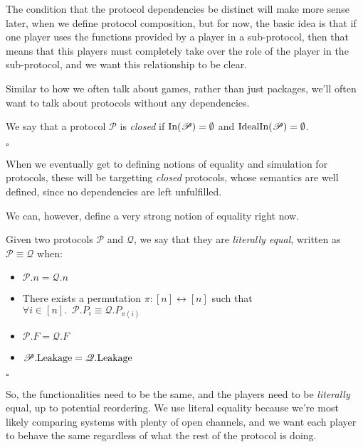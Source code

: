 The condition that the protocol dependencies be distinct
will make more sense later, when we define protocol composition,
but for now, the basic idea is that if one player uses
the functions provided by a player in a sub-protocol,
then that means that this players must completely take over
the role of the player in the sub-protocol,
and we want this relationship to be clear.

Similar to how we often talk about games, rather than just packages,
we'll often want to talk about protocols without any dependencies.

\begin{definition}
  We say that a protocol $\mathscr{P}$ is \emph{closed} if
  $\text{In}(\mathscr{P}) = \emptyset$ and $\text{IdealIn}(\mathscr{P}) = \emptyset$.

  $\square$
\end{definition}

When we eventually get to defining notions of equality and simulation
for protocols, these will be targetting \emph{closed} protocols,
whose semantics are well defined, since no dependencies are left unfulfilled.

We can, however, define a very strong notion of equality right now.

\begin{definition}
Given two protocols $\mathscr{P}$ and $\mathscr{Q}$, we say that
they are \emph{literally equal}, written as $\mathscr{P} \equiv \mathscr{Q}$
when:
\begin{itemize}
\item $\mathscr{P}.n = \mathscr{Q}.n$
\item There exists a permutation $\pi : [n] \leftrightarrow [n]$ such that
$
{\forall i \in [n].\enspace \mathscr{P}.P_i \equiv \mathscr{Q}.P_{\pi(i)}}
$
\item $\mathscr{P}.F = \mathscr{Q}.F$
\item $\mathscr{P}.\text{Leakage} = \mathscr{Q}.\text{Leakage}$
\end{itemize}

$\square$
\end{definition}

So, the functionalities need to be the same,
and the players need to be \emph{literally} equal,
up to potential reordering.
We use literal equality because we're most likely
comparing systems with plenty of open channels,
and we want each player to behave the same regardless of what
the rest of the protocol is doing.

